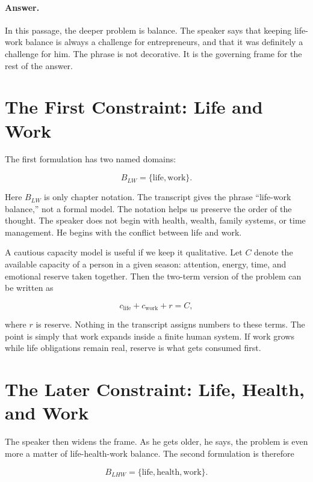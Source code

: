 \paragraph{Answer.}
In this passage, the deeper problem is balance. The speaker says that keeping life-work balance is always a challenge for entrepreneurs, and that it was definitely a challenge for him. The phrase is not decorative. It is the governing frame for the rest of the answer.

\section{The First Constraint: Life and Work}

The first formulation has two named domains:

\begin{equation}
B_{LW}=\{\text{life},\text{work}\}.
\end{equation}

Here \(B_{LW}\) is only chapter notation. The transcript gives the phrase ``life-work balance,'' not a formal model. The notation helps us preserve the order of the thought. The speaker does not begin with health, wealth, family systems, or time management. He begins with the conflict between life and work.

A cautious capacity model is useful if we keep it qualitative. Let \(C\) denote the available capacity of a person in a given season: attention, energy, time, and emotional reserve taken together. Then the two-term version of the problem can be written as

\begin{equation}
c_{\text{life}}+c_{\text{work}}+r=C,
\end{equation}

where \(r\) is reserve. Nothing in the transcript assigns numbers to these terms. The point is simply that work expands inside a finite human system. If work grows while life obligations remain real, reserve is what gets consumed first.

\section{The Later Constraint: Life, Health, and Work}

The speaker then widens the frame. As he gets older, he says, the problem is even more a matter of life-health-work balance. The second formulation is therefore

\begin{equation}
B_{LHW}=\{\text{life},\text{health},\text{work}\}.
\end{equation}

